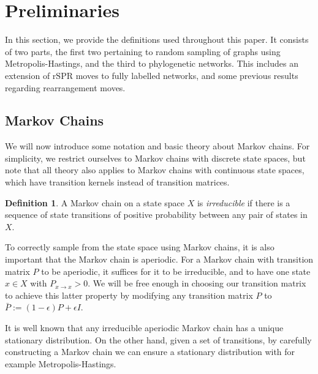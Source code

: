 \documentclass{article}
\theoremstyle{definition}
\newtheorem{definition}{Definition}
\newcommand{\rSPR}{\mathrm{rSPR}}
\begin{document}
\section{Preliminaries}
In this section, we provide the definitions used throughout this paper. It consists of two parts, the first two pertaining to random sampling of graphs using Metropolis-Hastings, and the third to phylogenetic networks. This includes an extension of $\rSPR$ moves to fully labelled networks, and some previous results regarding rearrangement moves. 

\subsection{Markov Chains}\label{sec:MCMC}
We will now introduce some notation and basic theory about Markov chains. For simplicity, we restrict ourselves to Markov chains with discrete state spaces, but note that all theory also applies to Markov chains with continuous state spaces, which have transition kernels instead of transition matrices.

\begin{definition}
A Markov chain on a state space $X$ is \emph{irreducible} if there is a sequence of state transitions of positive probability between any pair of states in $X$.
\end{definition}

To correctly sample from the state space using Markov chains, it is also important that the Markov chain is aperiodic. For a Markov chain with transition matrix $P$ to be aperiodic, it suffices for it to be irreducible, and to have one state $x\in X$ with $P_{x\to x}>0$. We will be free enough in choosing our transition matrix to achieve this latter property by modifying any transition matrix $P$ to $\bar{P}:= (1-\epsilon) P + \epsilon I$.

It is well known that any irreducible aperiodic Markov chain has a unique stationary distribution. On the other hand, given a set of transitions, by carefully constructing a Markov chain we can ensure a stationary distribution with for example Metropolis-Hastings.
\end{document}
